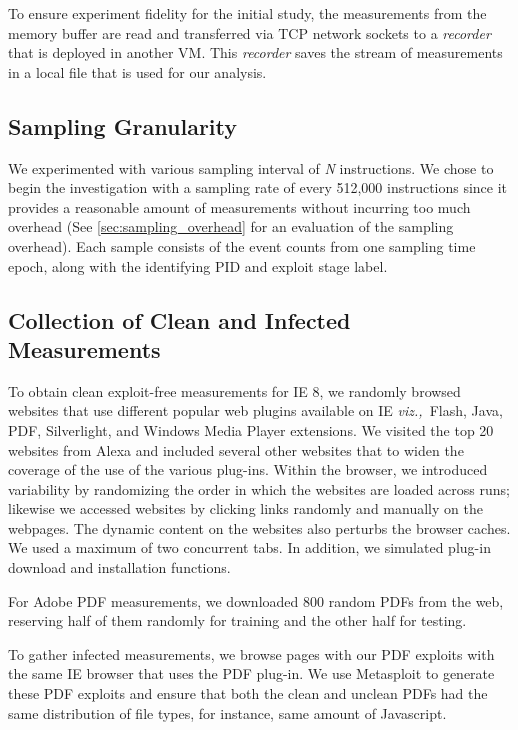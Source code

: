 \documentclass{acm_proc_article-sp}
\newcommand{\viz}[0]{{\it viz.,\ }}
\begin{document}
To ensure experiment fidelity for the initial study, the measurements
from the memory buffer are read and transferred via TCP network
sockets to a \textit{recorder} that is deployed in another VM. This
\textit{recorder} saves the stream of measurements in a local file
that is used for our analysis.

\subsection{Sampling Granularity}
We experimented with various sampling interval of \textit{N}
instructions. We chose to begin the investigation with a sampling
rate of every 512,000 instructions since it provides a reasonable
amount of measurements without incurring too much overhead (See 
\ref{sec:sampling_overhead} for an evaluation of the sampling
overhead). Each sample consists of the event counts from one sampling
time epoch, along with the identifying PID and exploit stage label.


\subsection{Collection of Clean and Infected \\Measurements} \label{sec:measurements}

To obtain clean exploit-free measurements for IE 8, we randomly
browsed websites that use different popular web plugins available
on IE \viz Flash, Java, PDF, Silverlight, and  Windows Media Player
extensions.  We visited the top 20 websites from Alexa and included several other websites that to widen the coverage of the use of the various plug-ins. Within the browser, we introduced variability by randomizing the order in which the websites are loaded across runs; likewise we accessed websites by clicking links randomly and manually on the webpages. The dynamic content on the websites also perturbs the browser caches. We used a maximum of two concurrent tabs. In addition, we simulated plug-in download and installation functions.

For Adobe PDF
measurements, we downloaded 800 random PDFs from the web, reserving half of them randomly for training and the other half for testing.

To gather infected measurements, we browse pages with our PDF exploits
with the same IE browser that uses the PDF plug-in. We use Metasploit to
generate these PDF exploits and ensure that both the clean
and unclean PDFs had the same distribution of file types, for
instance, same amount of Javascript.
\end{document}
